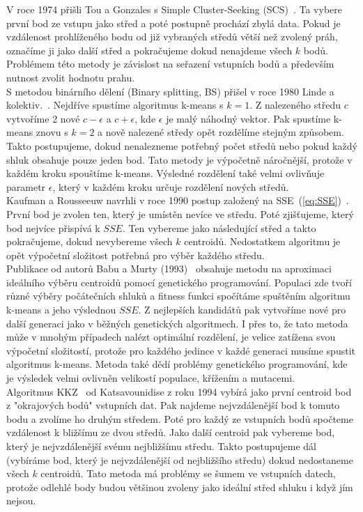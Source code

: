 V roce 1974 přišli Tou a Gonzales s Simple Cluster-Seeking (SCS)~\cite{Tou74}. Ta vybere první bod ze vstupu jako střed a poté postupně prochází zbylá data. Pokud je vzdálenost prohlíženého bodu od již vybraných středů větší než zvolený práh, označíme ji jako další střed a pokračujeme dokud nenajdeme všech $k$ bodů. Problémem této metody je závislost na seřazení vstupních bodů a především nutnost zvolit hodnotu prahu.\\

S metodou binárního dělení (Binary splitting, BS) přišel v roce 1980 Linde a kolektiv.~\cite{Linde80}. Nejdříve spustíme algoritmus k-means s $k=1$. Z nalezeného středu $c$ vytvoříme 2 nové $c-\epsilon$ a $c+\epsilon$, kde $\epsilon$ je malý náhodný vektor. Pak spustíme k-means znovu s $k=2$ a nově nalezené středy opět rozdělíme stejným způsobem. Takto postupujeme, dokud nenalezneme potřebný počet středů nebo pokud každý shluk obsahuje pouze jeden bod. Tato metody je výpočetně náročnější, protože v každém kroku spouštíme k-means. Výsledné rozdělení také velmi ovlivňuje parametr $\epsilon$, který v každém kroku určuje rozdělení nových středů.\\

Kaufman a Rousseeuw navrhli v roce 1990 postup založený na SSE~(\autoref{eq:SSE})~\cite{kaufman90}. První bod je zvolen ten, který je umístěn nevíce ve středu. Poté zjišťujeme, který bod nejvíce přispívá k $SSE$. Ten vybereme jako následující střed a takto pokračujeme, dokud nevybereme všech $k$ centroidů. Nedostatkem algoritmu je opět výpočetní složitost potřebná pro výběr každého středu.\\

Publikace od autorů Babu a Murty (1993)~\cite{babu93} obsahuje metodu na aproximaci ideálního výběru centroidů pomocí genetického programování. Populaci zde tvoří různé výběry počátečních shluků a fitness funkci spočítáme spuštěním algoritmu k-means a jeho výslednou $SSE$. Z nejlepších kandidátů pak vytvoříme nové pro další generaci jako v běžných genetických algoritmech. I přes to, že tato metoda může v mnohým případech nalézt optimální rozdělení, je velice zatížena svou výpočetní složitostí, protože pro každého jedince v každé generaci musíme spustit algoritmus k-means. Metoda také dědí problémy genetického programování, kde je výsledek velmi ovlivněn velikostí populace, křížením a mutacemi.\\

Algoritmus KKZ~\cite{katsavounidis94} od Katsavounidise z roku 1994 vybírá jako první centroid bod z "okrajových bodů" vstupních dat. Pak najdeme nejvzdálenější bod k tomuto bodu a zvolíme ho druhým středem. Poté pro každý ze vstupních bodů spočteme vzdálenost k bližšímu ze dvou středů. Jako další centroid pak vybereme bod, který je nejvzdálenější svému nejbližšímu středu. Takto postupujeme dál (vybíráme bod, který je nejvzdálenější od nejbližšího středu) dokud nedostaneme všech $k$ centroidů. Tato metoda má problémy se šumem ve vstupních datech, protože odlehlé body budou většinou zvoleny jako ideální střed shluku i když jím nejsou.\\

